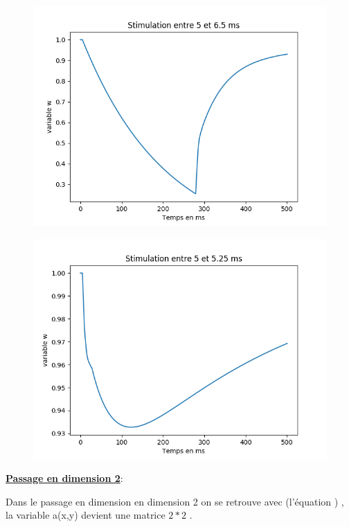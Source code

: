 \documentclass[a4paper,12pt,twoside]{report}
\begin{document}
\begin{figure}
	\centering
	\includegraphics[scale=0.5]{./w(t).png}
\end{figure}

\begin{figure}
	\centering
	\includegraphics[scale=0.5]{./w(t)_2.png}
\end{figure}




\underline{\textbf{Passage en dimension 2}}: 



Dans le passage en dimension en dimension 2 on se retrouve avec (l'équation ) , la variable a(x,y) devient une matrice $2*2$ .
\end{document}
